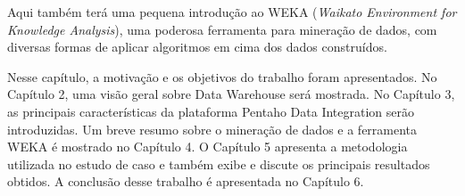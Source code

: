 Aqui também terá uma pequena introdução ao WEKA (\textit{Waikato Environment for Knowledge Analysis}), uma poderosa ferramenta para mineração de dados, com diversas formas de aplicar algoritmos em cima dos dados construídos.

Nesse capítulo, a motivação e os objetivos do trabalho foram apresentados. No Capítulo 2, uma visão geral sobre Data Warehouse será mostrada. No Capítulo 3, as principais características da plataforma Pentaho Data Integration serão introduzidas. Um breve resumo sobre o mineração de dados e a ferramenta WEKA é mostrado no Capítulo 4. O Capítulo 5 apresenta a metodologia utilizada no estudo de caso e também exibe e discute os principais resultados obtidos. A conclusão desse trabalho é apresentada no Capítulo 6.